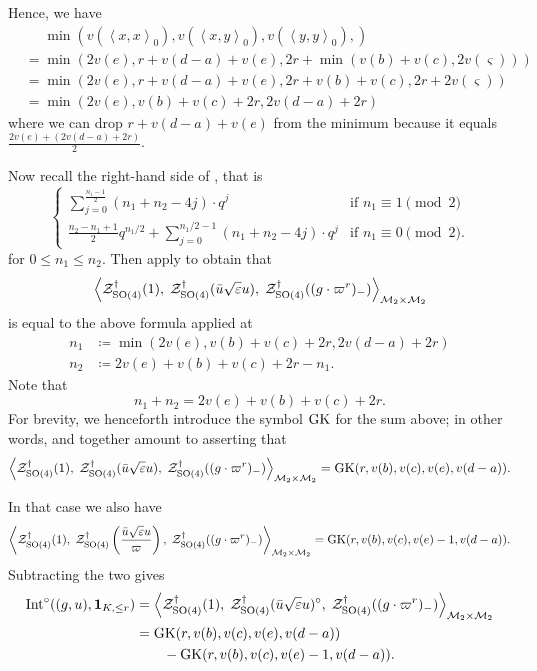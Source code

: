 Hence, we have
\begin{align*}
  &\phantom= \min\left(
    v(\left\langle x,x \right\rangle _0),
    v(\left\langle x,y \right\rangle _0),
    v(\left\langle y,y \right\rangle _0),
  \right) \\
  &= \min\left( 2v(e), r+v(d-a)+v(e), 2r+\min(v(b)+v(c), 2v(\varsigma)) \right) \\
  &= \min\left( 2v(e), r+v(d-a)+v(e), 2r+v(b)+v(c), 2r+2v(\varsigma) \right) \\
  &= \min\left( 2v(e), v(b)+v(c)+2r, 2v(d-a)+2r \right)
\end{align*}
where we can drop $r+v(d-a)+v(e)$ from the minimum because it equals
$\frac{2v(e) + (2v(d-a)+2r)}{2}$.

Now recall the right-hand side of , that is
\[
  \begin{cases}
    \sum_{j=0}^{\frac{n_1-1}{2}} (n_1+n_2-4j) \cdot q^j & \text{if } n_1 \equiv 1 \pmod 2 \\
    \frac{n_2-n_1+1}{2} q^{n_1/2} + \sum_{j=0}^{n_1/2-1} (n_1+n_2-4j) \cdot q^j & \text{if } n_1 \equiv 0 \pmod 2.
  \end{cases}
\]
for $0 \le n_1 \le n_2$.
Then apply  to obtain that
\[
  \left< \mathcal Z^{\dagger}_{\operatorname{SO}(4)}(1), \;
    \mathcal Z^{\dagger}_{\operatorname{SO}(4)}(\bar u \sqrt{\varepsilon} u), \;
    \mathcal Z^{\dagger}_{\operatorname{SO}(4)}((g \cdot \varpi^r)_-) \right>_{\mathcal M_2 \times \mathcal M_2}
\]
is equal to the above formula applied at
\begin{align*}
  n_1 &\coloneqq \min(2v(e), v(b)+v(c)+2r, 2v(d-a)+2r) \\
  n_2 &\coloneqq 2v(e) + v(b) + v(c) + 2r - n_1.
\end{align*}
Note that
\[ n_1 + n_2 = 2v(e) + v(b) + v(c) + 2r. \]
For brevity, we henceforth introduce the symbol $\operatorname{GK}$ for the sum above;
in other words,  and 
together amount to asserting that
\begin{equation}
  \left< \mathcal Z^{\dagger}_{\operatorname{SO}(4)}(1), \; \mathcal Z^{\dagger}_{\operatorname{SO}(4)}(\bar u \sqrt{\varepsilon} u), \; \mathcal Z^{\dagger}_{\operatorname{SO}(4)}((g \cdot \varpi^r)_-) \right>_{\mathcal M_2 \times \mathcal M_2}
    = \operatorname{GK}(r, v(b), v(c), v(e), v(d-a)).
  \label{eq:GKdef}
\end{equation}

In that case we also have
\[
  \left< \mathcal Z^{\dagger}_{\operatorname{SO}(4)}(1), \;
    \mathcal Z^{\dagger}_{\operatorname{SO}(4)}\left(\frac{\bar u \sqrt{\varepsilon} u}{\varpi}\right), \;
    \mathcal Z^{\dagger}_{\operatorname{SO}(4)}((g \cdot \varpi^r)_-) \right>_{\mathcal M_2 \times \mathcal M_2}
    = \operatorname{GK}(r, v(b), v(c), v(e)-1, v(d-a)). \]
Subtracting the two gives
\begin{equation}
  \begin{aligned}
    \operatorname{Int}^\circ((g,u), \mathbf{1}_{K, \le r}) &=
      \left< \mathcal Z^{\dagger}_{\operatorname{SO}(4)}(1), \;
        \mathcal Z^{\dagger}_{\operatorname{SO}(4)}(\bar u \sqrt{\varepsilon} u)^\circ, \;
        \mathcal Z^{\dagger}_{\operatorname{SO}(4)}((g \cdot \varpi^r)_-) \right>_{\mathcal M_2 \times \mathcal M_2} \\
    &= \operatorname{GK}(r, v(b), v(c), v(e), v(d-a)) \\
    &\qquad- \operatorname{GK}(r, v(b), v(c), v(e)-1, v(d-a)).
  \end{aligned}
  \label{eq:int_subtract}
\end{equation}

